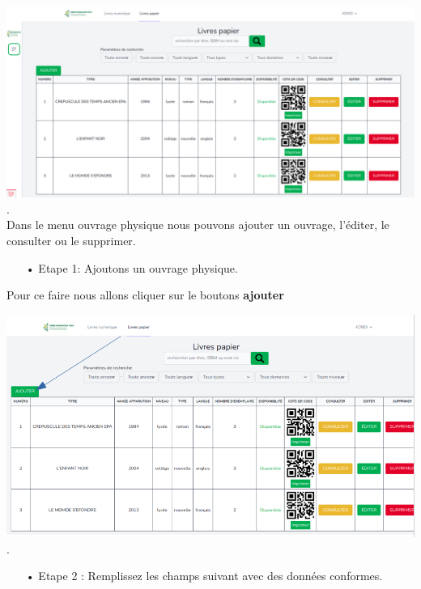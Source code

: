 \documentclass[12pt,a4paper]{article}
\begin{document}
\includegraphics[scale=0.35]{images/SelectOuvragesPhysique.png}. \\

Dans le menu ouvrage physique nous pouvons ajouter un ouvrage, l'éditer, le consulter ou le supprimer.

\begin{itemize}
\item[•]Etape 1: Ajoutons un ouvrage physique.
\end{itemize}

Pour ce faire nous allons cliquer sur le boutons \textbf{ajouter} 

\includegraphics[scale=0.5]{images/SelectOuvragesPhysique2.png}. \\

\begin{itemize}
\item[•]Etape 2 : Remplissez les champs suivant avec des données conformes.
\end{itemize}
\end{document}
